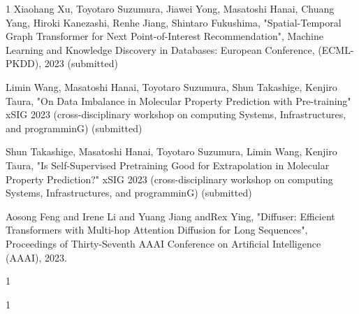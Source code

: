 \begin{査読付}{1}
Xiaohang Xu, Toyotaro Suzumura, Jiawei Yong, Masatoshi Hanai, Chuang Yang, Hiroki Kanezashi, Renhe Jiang, Shintaro Fukushima, "Spatial-Temporal Graph Transformer for Next Point-of-Interest Recommendation", Machine Learning and Knowledge Discovery in Databases: European Conference, (ECML-PKDD), 2023 (submitted)


Limin Wang, Masatoshi Hanai, Toyotaro Suzumura, Shun Takashige, Kenjiro Taura, "On Data Imbalance in Molecular Property Prediction with Pre-training" xSIG 2023 (cross-disciplinary workshop on computing Systems, Infrastructures, and programminG)  (submitted)

Shun Takashige, Masatoshi Hanai, Toyotaro Suzumura, Limin Wang, Kenjiro Taura, "Is Self-Supervised Pretraining Good for Extrapolation in Molecular Property Prediction?" xSIG 2023 (cross-disciplinary workshop on computing Systems, Infrastructures, and programminG) (submitted)




Aosong Feng and Irene Li and Yuang Jiang andRex  Ying, "Diffuser: Efficient Transformers with Multi-hop Attention Diffusion for Long Sequences", Proceedings of Thirty-Seventh AAAI Conference on Artificial Intelligence (AAAI), 2023.

\end{査読付}

\begin{公開}{1}


\end{公開}

\begin{特許}{1}


\end{特許}

